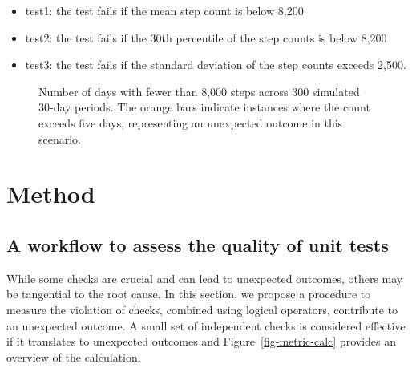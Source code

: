 \documentclass[
  12pt,
]{interact}
\providecommand{\tightlist}{%
  \setlength{\itemsep}{0pt}\setlength{\parskip}{0pt}}\usepackage{longtable,booktabs,array}
\begin{document}
\begin{itemize}
\tightlist
\item
  test1: the test fails if the mean step count is below 8,200
\item
  test2: the test fails if the 30th percentile of the step counts is
  below 8,200
\item
  test3: the test fails if the standard deviation of the step counts
  exceeds 2,500.
\end{itemize}

\label{cell-fig-step-count}
\begin{figure}[H]


\caption{\label{fig-step-count}Number of days with fewer than 8,000
steps across 300 simulated 30-day periods. The orange bars indicate
instances where the count exceeds five days, representing an unexpected
outcome in this scenario.}

\end{figure}%

\section{Method}\label{sec-method}

\subsection{A workflow to assess the quality of unit
tests}\label{a-workflow-to-assess-the-quality-of-unit-tests}

While some checks are crucial and can lead to unexpected outcomes,
others may be tangential to the root cause. In this section, we propose
a procedure to measure the violation of checks, combined using logical
operators, contribute to an unexpected outcome. A small set of
independent checks is considered effective if it translates to
unexpected outcomes and Figure~\ref{fig-metric-calc} provides an
overview of the calculation.
\end{document}
